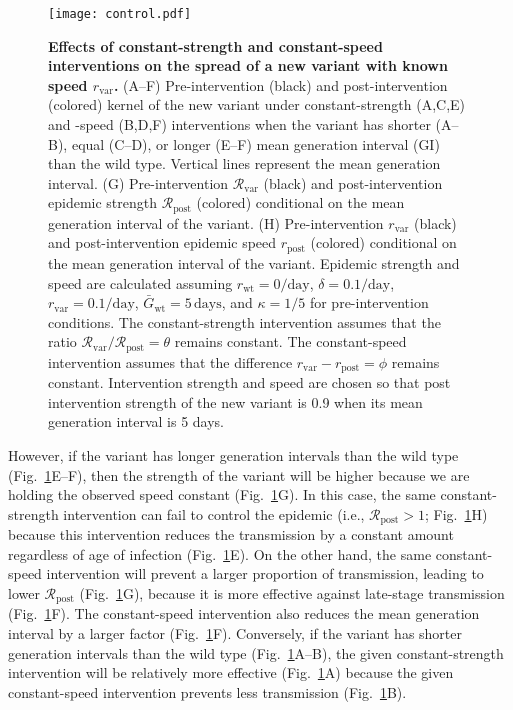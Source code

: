 \documentclass[12pt]{article}
\newcommand{\fref}[1]{Fig.~\ref{fig:#1}}
\newcommand{\vvvar}{\mathrm{var}}
\newcommand{\wwwt}{\mathrm{wt}}
\newcommand{\rx}[1]{\ensuremath{{r}_{#1}}\xspace}
\newcommand{\ry}[1]{\rx{\mathrm{#1}}}
\newcommand{\rw}{\rx{\wwwt}}
\newcommand{\rv}{\rx{\vvvar}}
\newcommand{\Rx}[1]{\ensuremath{{\mathcal R}_{#1}}\xspace}
\newcommand{\Ry}[1]{\Rx{\mathrm{#1}}}
\newcommand{\Rv}{\Rx{\vvvar}}
\newcommand{\pday}{\ensuremath{/\textrm{day}}}
\newcommand{\Gx}[1]{\ensuremath{{\bar G}_{#1}}\xspace}
\newcommand{\Gy}[1]{\Gx{\mathrm{#1}}}
\begin{document}
\begin{figure}[!pth]
\begin{center}
\texttt{[image: control.pdf]}
\caption{
\textbf{Effects of constant-strength and constant-speed interventions on the spread of a new variant with known speed \rv.}
(A--F) Pre-intervention (black) and post-intervention (colored) kernel of the new variant under constant-strength (A,C,E) and -speed (B,D,F) interventions when the variant has shorter (A--B), equal (C--D), or longer (E--F) mean generation interval (GI) than the wild type.
Vertical lines represent the mean generation interval.
(G) Pre-intervention $\Rv$ (black) and post-intervention epidemic strength $\Ry{post}$ (colored) conditional on the mean generation interval of the variant.
(H) Pre-intervention $\rv$ (black) and post-intervention epidemic speed $\ry{post}$ (colored) conditional on the mean generation interval of the variant.
Epidemic strength and speed are calculated assuming $\rw=0\pday$, $\delta=0.1\pday$, $\rv=0.1\pday$, $\Gy{wt}=5\,\textrm{days}$, and $\kappa=1/5$ for pre-intervention conditions.
The constant-strength intervention assumes that the ratio $\Rv/\Ry{post} = \theta$ remains constant.
The constant-speed intervention assumes that the difference $\rv - \ry{post} = \phi$ remains constant.
Intervention strength and speed are chosen so that post intervention strength of the new variant is 0.9 when its mean generation interval is 5 days.
}
\label{fig:strengthspeed}
\end{center}
\end{figure}

However, if the variant has longer generation intervals than the wild type (\fref{strengthspeed}E--F), then the strength of the variant will be higher because we are holding the observed speed constant (\fref{strengthspeed}G).
In this case, the same constant-strength intervention can fail to control the epidemic (i.e., $\Ry{post} > 1$; \fref{strengthspeed}H) because this intervention reduces the transmission by a constant amount regardless of age of infection (\fref{strengthspeed}E).
On the other hand, the same constant-speed intervention will prevent a larger proportion of transmission, leading to lower $\Ry{post}$ (\fref{strengthspeed}G), because it is more effective against late-stage transmission (\fref{strengthspeed}F).
The constant-speed intervention also reduces the mean generation interval by a larger factor (\fref{strengthspeed}F).
Conversely, if the variant has shorter generation intervals than the wild type (\fref{strengthspeed}A--B), the given constant-strength intervention will be relatively more effective (\fref{strengthspeed}A) because the given constant-speed intervention prevents less transmission (\fref{strengthspeed}B).
\end{document}
